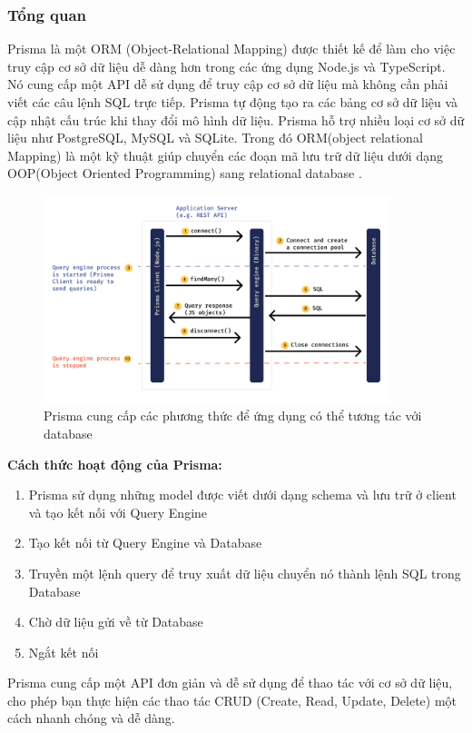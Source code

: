 \subsubsection{Tổng quan}
\hspace*{1cm} Prisma là một ORM (Object-Relational Mapping) được thiết kế để làm cho việc truy cập cơ sở dữ liệu dễ dàng hơn trong các ứng dụng Node.js và TypeScript. Nó cung cấp một API dễ sử dụng để truy cập cơ sở dữ liệu mà không cần phải viết các câu lệnh SQL trực tiếp. Prisma tự động tạo ra các bảng cơ sở dữ liệu và cập nhật cấu trúc khi thay đổi mô hình dữ liệu. Prisma hỗ trợ nhiều loại cơ sở dữ liệu như PostgreSQL, MySQL và SQLite. Trong đó ORM(object relational Mapping) là một kỹ thuật giúp chuyển các đoạn mã lưu trữ dữ liệu dưới dạng OOP(Object Oriented Programming) sang relational database \cite{prisma}.\\
\begin{figure}[H]
    \centering
    \includegraphics[width=0.9\textwidth]{Images/technology/prisma-architecture.png}
    \caption{Prisma cung cấp các phương thức để ứng dụng có thể tương tác với database}
\end{figure}
\textbf{Cách thức hoạt động của Prisma:}
\begin{enumerate}
    \item Prisma sử dụng những model được viết dưới dạng schema và lưu trữ ở client và tạo kết nối với Query Engine
    \item Tạo kết nối từ Query Engine và Database
    \item Truyền một lệnh query để truy xuất dữ liệu chuyển nó thành lệnh SQL trong Database
    \item Chờ dữ liệu gửi về từ Database
    \item Ngắt kết nối
\end{enumerate}
Prisma cung cấp một API đơn giản và dễ sử dụng để thao tác với cơ sở dữ liệu, cho phép
bạn thực hiện các thao tác CRUD (Create, Read, Update, Delete) một cách nhanh chóng và dễ
dàng.

